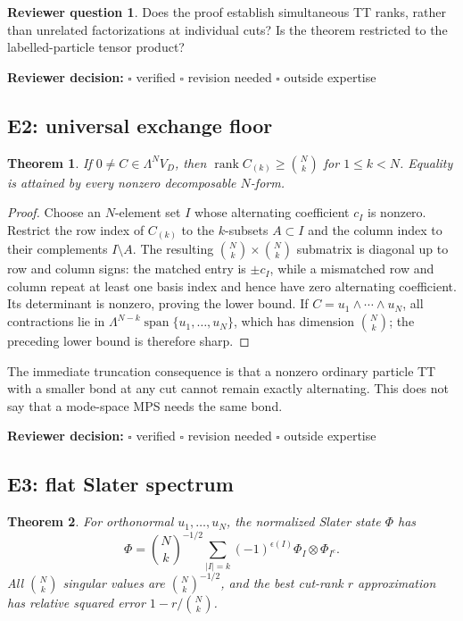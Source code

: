 \documentclass[11pt]{article}
\newtheorem{theorem}{Theorem}[section]
\theoremstyle{definition}
\newtheorem*{reviewquestion}{Reviewer question}
\newcommand{\rank}{\operatorname{rank}}
\newcommand{\reviewline}{\par\smallskip\noindent
  \textbf{Reviewer decision:} $\square$ verified \quad $\square$ revision
  needed \quad $\square$ outside expertise\par\medskip}
\begin{document}
\begin{reviewquestion}
Does the proof establish simultaneous TT ranks, rather than unrelated
factorizations at individual cuts?  Is the theorem restricted to the
labelled-particle tensor product?
\end{reviewquestion}
\reviewline

\subsection{E2: universal exchange floor}

\begin{theorem}
If $0\ne C\in\Lambda^N V_D$, then
$\rank C_{(k)}\ge\binom Nk$ for $1\le k<N$.  Equality is attained by every
nonzero decomposable $N$-form.
\end{theorem}

\begin{proof}
Choose an $N$-element set $I$ whose alternating coefficient $c_I$ is nonzero.
Restrict the row index of $C_{(k)}$ to the $k$-subsets $A\subset I$ and the
column index to their complements $I\setminus A$.  The resulting
$\binom Nk\times\binom Nk$ submatrix is diagonal up to row and column signs:
the matched entry is $\pm c_I$, while a mismatched row and column repeat at
least one basis index and hence have zero alternating coefficient.  Its
determinant is nonzero, proving the lower bound.  If
$C=u_1\wedge\cdots\wedge u_N$, all contractions lie in
$\Lambda^{N-k}\operatorname{span}\{u_1,\ldots,u_N\}$, which has dimension
$\binom Nk$; the preceding lower bound is therefore sharp.
\end{proof}

The immediate truncation consequence is that a nonzero ordinary particle TT
with a smaller bond at any cut cannot remain exactly alternating.  This does
not say that a mode-space MPS needs the same bond.

\reviewline

\subsection{E3: flat Slater spectrum}

\begin{theorem}
For orthonormal $u_1,\ldots,u_N$, the normalized Slater state $\Phi$ has
\begin{equation}
\Phi=\binom Nk^{-1/2}\sum_{|I|=k}(-1)^{\epsilon(I)}
\Phi_I\otimes\Phi_{I^c}.
\label{audit:slater-schmidt}
\end{equation}
All $\binom Nk$ singular values are $\binom Nk^{-1/2}$, and the best cut-rank
$r$ approximation has relative squared error
$1-r/\binom Nk$.
\end{theorem}
\end{document}
